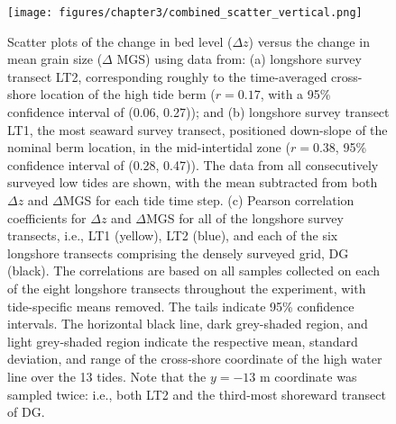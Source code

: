 \begin{figure}[tbp] %
	\begin{center}
		\texttt{[image: figures/chapter3/combined\_scatter\_vertical.png]}
		\caption[Cross-shore dependence of correlations between bed level and mean grain size change]{Scatter plots of the change in bed level ($\Delta z$) versus the change in mean grain size ($\Delta$ MGS) using data from: (a) longshore survey transect LT2, corresponding roughly to the time-averaged cross-shore location of the high tide berm ($r=0.17$, with a 95\% confidence interval of (0.06, 0.27)); and (b) longshore survey transect LT1, the most seaward survey transect, positioned down-slope of the nominal berm location, in the mid-intertidal zone ($r=0.38$, 95\% confidence interval of (0.28, 0.47)). The data from all consecutively surveyed low tides are shown, with the mean subtracted from both $\Delta z$ and $\Delta$MGS for each tide time step. (c) Pearson correlation coefficients for $\Delta z$ and $\Delta$MGS for all of the longshore survey transects, i.e., LT1 (yellow), LT2 (blue), and each of the six longshore transects comprising the densely surveyed grid, DG (black). The correlations are based on all samples collected on each of the eight longshore transects throughout the experiment, with tide-specific means removed. The tails indicate 95\% confidence intervals. The horizontal black line, dark grey-shaded region, and light grey-shaded region indicate the respective mean, standard deviation, and range of the cross-shore coordinate of the high water line over the 13 tides. Note that the $y=-13$ m coordinate was sampled twice: i.e., both LT2 and the third-most shoreward transect of DG.}
		\label{fig:corr_coeffs_spatial}
	\end{center}
\end{figure}

